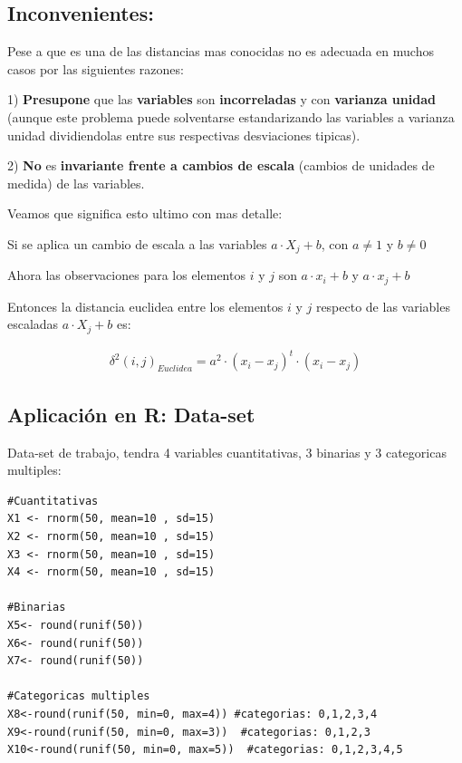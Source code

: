 \documentclass[12pt]{report} %
\begin{document}
\vspace{0.2cm}

\subsection{Inconvenientes:}

Pese a que es una de las distancias mas conocidas no es adecuada en muchos casos por las siguientes razones:

1) \hspace{0.15cm} \textbf{Presupone} que las \textbf{variables} son \textbf{incorreladas} y con \textbf{varianza unidad} (aunque este problema puede solventarse estandarizando las variables a varianza unidad dividiendolas entre sus respectivas desviaciones tipicas). 

2) \hspace{0.15cm} \textbf{No} es \textbf{invariante frente a cambios de escala} (cambios de unidades de medida) de las variables.

\vspace{0.6cm}

Veamos que significa esto ultimo con mas detalle:

Si se aplica un cambio de escala a las variables $a\cdot X_j + b$, con $a\neq 1$ y $b\neq 0$

Ahora las observaciones para los elementos $i$ y $j$ son $a\cdot x_i + b$ y $a\cdot x_j + b$ 

Entonces la distancia euclidea entre los elementos $i$ y $j$ respecto de las variables escaladas $a\cdot X_j + b$ es:

\begin{gather*}
\delta^2(i,j)_{Euclidea} = a^2 \cdot (x_i - x_j)^t\cdot (x_i - x_j)
\end{gather*}


\subsection{Aplicación en R: Data-set}

Data-set de trabajo, tendra 4 variables cuantitativas, 3 binarias y 3 categoricas multiples:

\begin{lstlisting}
#Cuantitativas
X1 <- rnorm(50, mean=10 , sd=15)
X2 <- rnorm(50, mean=10 , sd=15)
X3 <- rnorm(50, mean=10 , sd=15)
X4 <- rnorm(50, mean=10 , sd=15)

#Binarias 
X5<- round(runif(50))
X6<- round(runif(50))
X7<- round(runif(50))

#Categoricas multiples 
X8<-round(runif(50, min=0, max=4)) #categorias: 0,1,2,3,4
X9<-round(runif(50, min=0, max=3))  #categorias: 0,1,2,3
X10<-round(runif(50, min=0, max=5))  #categorias: 0,1,2,3,4,5
\end{lstlisting}
\end{document}
